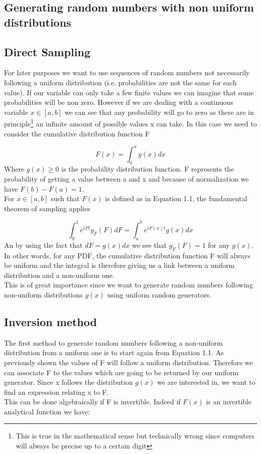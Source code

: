 \documentclass[10 pt]{article}
\numberwithin{equation}{section}
\begin{document}
\begin{multicols}{2}

\section{Generating random numbers with non uniform distributions}

\subsection{Direct Sampling}

For later purposes we want to use sequences of random numbers not necessarily following a uniform distribution (i.e. probabilities are not the same for each value).
If our variable can only take a few finite values we can imagine that some probabilities will be non zero. However if we are dealing with a continuous variable $x \in [a,b]$ we can see that any probability will go to zero as there are in principle\footnote{This is true in the mathematical sense but technically wrong since computers will always be precise up to a certain digit} an infinite amount of possible values x can take. In this case we need to consider the cumulative distribution function F\cite{cumuldesmandas}

\begin{equation}
F(x) = \int _a ^x g(x)dx
\end{equation}
Where $g(x) \ge 0$ is the probability distribution function. F represents the probability of getting a value between a and x and because of normalization we have $F(b) - F(a) = 1$.\\
For $x \in [a,b]$ such that $F(x)$ is defined as in Equation 1.1, the fundamental theorem of sampling applies\cite{fundamental}

\begin{equation}
\int _0 ^1 e^{iFt} g_F(F)dF = \int _a ^b e^{iF(x)t} g(x)dx
\end{equation}
An by using the fact that $dF = g(x)dx$ we see that $g_F(F) = 1$ for any $g(x)$. In other words, for any PDF, the cumulative distribution function F will always be uniform and the integral is therefore giving us a link between a uniform distribution and a non-uniform one.\\
This is of great importance since we want to generate random numbers following non-uniform distributions $g(x)$ using uniform random generators.

\subsection{Inversion method}
The first method to generate random numbers following a non-uniform distribution from a uniform one is to start again from Equation 1.1. As previously shown the values of F will follow a uniform distribution. Therefore we can associate F to the values which are going to be returned by our uniform generator. Since x follows the distribution $g(x)$ we are interested in, we want to find an expression relating x to F.\\
This can be done algebraically if F is invertible. Indeed if $F(x)$ is an invertible analytical function we have:


\end{multicols}
\end{document}
